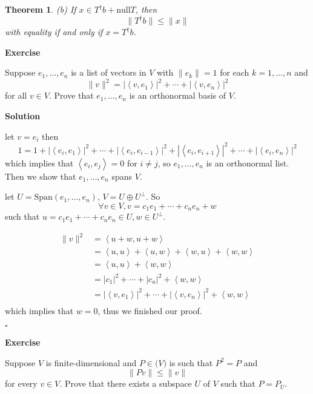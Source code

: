 \documentclass{article}
\newtheorem{theorem}{Theorem}[subsection]
\newenvironment{exercise}{%
{\textbf{Exercise\\}
    }
}{
}
\newenvironment{solution}{%
{
    \textbf{Solution\\}
    }
}{
  \hfill $\square$ 
  \par\bigskip 
}
\newcommand{\spans}{\text{Span}}
\newcommand{\n}{\text{null}}
\begin{document}
\begin{CJK}{UTF8}{gkai}
\begin{theorem}
    (b) If $x \in T^\dagger b+ \n T$, then
    \[\|T^\dagger b\| \leq \|x\|\]
    with equality if and only if $x = T^\dagger b$.
\end{theorem}

\begin{exercise}
    Suppose $e_1,\ldots,e_n$ is a list of vectors in $V$ with $\|e_k\| = 1$ for each $k = 1,\ldots,n$
    and
    \[\|v\|^2 = |\left<v,e_1\right>|^2 + \cdots + |\left<v,e_n\right>|^2\]
    for all $v \in V$. Prove that $e_1,\ldots,e_n$ is an orthonormal basis of $V$.
\end{exercise}

\begin{solution}
    let $v = e_i$ then
    \[1 = 1 + |\left<e_i,e_1\right>|^2 +\cdots +  |\left<e_i,e_{i - 1}\right>|^2 + |\left<e_i,e_{i + 1}\right>|^2 +\cdots + |\left<e_i,e_n\right>|^2 \]
    which implies that $\left<e_i,e_j\right> = 0$ for $i \neq j$, so $e_1,\ldots,e_n$ is an orthonormal list.\\

    Then we show that $e_1,\ldots,e_n$ spans $V$.

    let $U = \spans(e_1,\ldots,e_n)$, $V = U \oplus U^\bot$. So 
    \[\forall v \in V, v = c_1 e_1 + \cdots + c_n e_n + w\] 
    such that $u = c_1 e_1 + \cdots + c_n e_n \in U, w \in U^\bot$.

    \[
    \begin{aligned}
        \|v\|^2 &= \left<u + w,u + w\right> \\
        &= \left<u,u\right>+\left<u,w\right> + \left< w, u\right> + \left< w, w\right> \\
        &= \left<u,u\right> + \left< w, w\right>\\
        &= |c_1|^2 + \cdots + |c_n|^2 + \left< w, w\right>\\
        &= |\left<v,e_1\right>|^2 + \cdots + |\left<v,e_n\right>|^2 + \left< w, w\right>\\
    \end{aligned}    
    \]
    which implies that $w = 0$, thus we finished our proof.

\end{solution}

\begin{exercise}
    Suppose $V$ is finite-dimensional and $P \in \mathcal(V)$ is such that $P^2 = P$ and
    \[\|Pv\| \leq \|v\|\]
    for every $v \in V$. Prove that there exists a subspace $U$ of $V$ such that $P = P_U$.
\end{exercise}


\end{CJK}
\end{document}
